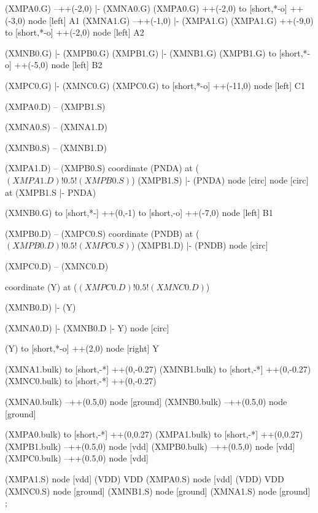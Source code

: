 \begin{circuitikz}[american]

	(XMPA0.G) --++(-2,0) |- (XMNA0.G)
	(XMPA0.G) ++(-2,0) to [short,*-o] ++(-3,0) node [left] {A1}
	(XMNA1.G) --++(-1,0) |- (XMPA1.G)
	(XMPA1.G) ++(-9,0) to [short,*-o] ++(-2,0) node [left] {A2}
	
	(XMNB0.G) |- (XMPB0.G)
	(XMPB1.G) |- (XMNB1.G)
	(XMPB1.G) to [short,*-o] ++(-5,0) node [left] {B2}
	
	(XMPC0.G) |- (XMNC0.G)
	(XMPC0.G) to [short,*-o] ++(-11,0) node [left] {C1}
	
	
	(XMPA0.D) -- (XMPB1.S)
	
	(XMNA0.S) -- (XMNA1.D)
	
	(XMNB0.S) -- (XMNB1.D)
	
	(XMPA1.D) -- (XMPB0.S)
	coordinate (PNDA) at ($(XMPA1.D)!0.5!(XMPB0.S)$) 
	(XMPB1.S) |- (PNDA) node [circ]{}
	node [circ] at  (XMPB1.S |- PNDA){}
	
	(XMNB0.G) to [short,*-] ++(0,-1) to [short,-o] ++(-7,0) node [left] {B1}
	
	(XMPB0.D) -- (XMPC0.S)
	coordinate (PNDB) at ($(XMPB0.D)!0.5!(XMPC0.S)$) 
	(XMPB1.D) |-  (PNDB) node [circ] {}
	
	(XMPC0.D) -- (XMNC0.D)
	
	coordinate (Y) at ($(XMPC0.D)!0.5!(XMNC0.D)$)
	
	(XMNB0.D) |- (Y)
	
	(XMNA0.D) |- (XMNB0.D |- Y) node [circ]{}
	
	(Y) to [short,*-o] ++(2,0) node [right] {Y}
	
	
	(XMNA1.bulk) to [short,-*] ++(0,-0.27)
	(XMNB1.bulk) to [short,-*] ++(0,-0.27)
	(XMNC0.bulk) to [short,-*] ++(0,-0.27)
	
	(XMNA0.bulk) --++(0.5,0) node [ground]{}
	(XMNB0.bulk) --++(0.5,0) node [ground]{}
	
	(XMPA0.bulk) to [short,-*] ++(0,0.27)
	(XMPA1.bulk) to [short,-*] ++(0,0.27)
	(XMPB1.bulk) --++(0.5,0) node [vdd]{}
	(XMPB0.bulk) --++(0.5,0) node [vdd]{}
	(XMPC0.bulk) --++(0.5,0) node [vdd]{}


	(XMPA1.S) node [vdd] (VDD) {VDD}
	(XMPA0.S) node [vdd] (VDD) {VDD}
	(XMNC0.S) node [ground] {}
	(XMNB1.S) node [ground] {}
	(XMNA1.S) node [ground] {}
;

\end{circuitikz}
